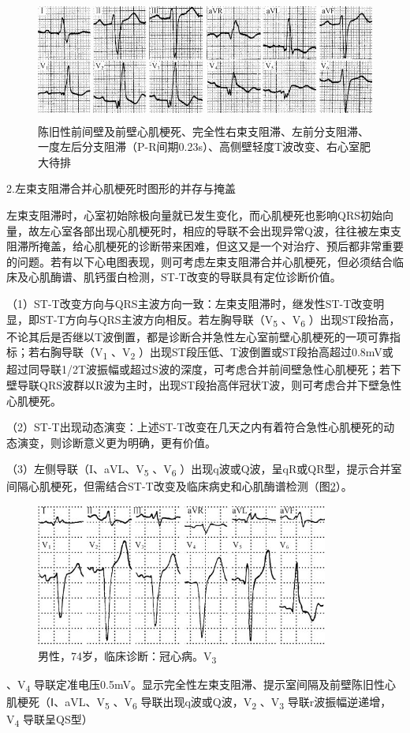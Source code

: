 \begin{figure}[!htbp]
 \centering
 \includegraphics[width=4.98958in,height=1.59375in]{./images/Image00585.jpg}
 \captionsetup{justification=centering}
 \caption{陈旧性前间壁及前壁心肌梗死、完全性右束支阻滞、左前分支阻滞、一度左后分支阻滞（P-R间期0.23s）、高侧壁轻度T波改变、右心室肥大待排}
 \label{fig36-13}
  \end{figure} 

2.左束支阻滞合并心肌梗死时图形的并存与掩盖

左束支阻滞时，心室初始除极向量就已发生变化，而心肌梗死也影响QRS初始向量，故左心室各部出现心肌梗死时，相应的导联不会出现异常Q波，往往被左束支阻滞所掩盖，给心肌梗死的诊断带来困难，但这又是一个对治疗、预后都非常重要的问题。若有以下心电图表现，则可考虑左束支阻滞合并心肌梗死，但必须结合临床及心肌酶谱、肌钙蛋白检测，ST-T改变的导联具有定位诊断价值。

（1）ST-T改变方向与QRS主波方向一致：左束支阻滞时，继发性ST-T改变明显，即ST-T方向与QRS主波方向相反。若左胸导联（V\textsubscript{5}
、V\textsubscript{6}
）出现ST段抬高，不论其后是否继以T波倒置，都是诊断合并急性左心室前壁心肌梗死的一项可靠指标；若右胸导联（V\textsubscript{1}
、V\textsubscript{2}
）出现ST段压低、T波倒置或ST段抬高超过0.8mV或超过同导联1/2T波振幅或超过S波的深度，可考虑合并前间壁急性心肌梗死；若下壁导联QRS波群以R波为主时，出现ST段抬高伴冠状T波，则可考虑合并下壁急性心肌梗死。

（2）ST-T出现动态演变：上述ST-T改变在几天之内有着符合急性心肌梗死的动态演变，则诊断意义更为明确，更有价值。

（3）左侧导联（I、aVL、V\textsubscript{5} 、V\textsubscript{6}
）出现q波或Q波，呈qR或QR型，提示合并室间隔心肌梗死，但需结合ST-T改变及临床病史和心肌酶谱检测（图\ref{fig36-14}）。

\begin{figure}[!htbp]
 \centering
 \includegraphics[width=3.79167in,height=1.83333in]{./images/Image00586.jpg}
 \captionsetup{justification=centering}
 \caption{男性，74岁，临床诊断：冠心病。V\textsubscript{3}}
 \label{fig36-14}
  \end{figure} 
、V\textsubscript{4}
导联定准电压0.5mV。显示完全性左束支阻滞、提示室间隔及前壁陈旧性心肌梗死（Ⅰ、aVL、V\textsubscript{5}
、V\textsubscript{6} 导联出现q波或Q波，V\textsubscript{2}
、V\textsubscript{3} 导联r波振幅逆递增，V\textsubscript{4} 导联呈QS型）

